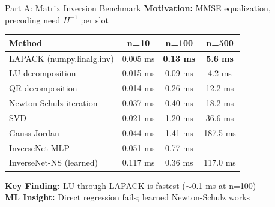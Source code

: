 \documentclass[aspectratio=169]{beamer}
\begin{document}
\begin{frame}{Part A: Matrix Inversion Benchmark}
\textbf{Motivation:} MMSE equalization, precoding need $H^{-1}$ per slot

\begin{table}
\centering
\small
\begin{tabular}{lccc}
\toprule
\textbf{Method} & \textbf{n=10} & \textbf{n=100} & \textbf{n=500} \\
\midrule
LAPACK (numpy.linalg.inv) & 0.005 ms & \textbf{0.13 ms} & \textbf{5.6 ms} \\
LU decomposition & 0.015 ms & 0.09 ms & 4.2 ms \\
QR decomposition & 0.014 ms & 0.26 ms & 12.2 ms \\
Newton-Schulz iteration & 0.037 ms & 0.40 ms & 18.2 ms \\
SVD & 0.021 ms & 1.20 ms & 36.6 ms \\
Gauss-Jordan & 0.044 ms & 1.41 ms & 187.5 ms \\
InverseNet-MLP & 0.051 ms & 0.77 ms & --- \\
InverseNet-NS (learned) & 0.117 ms & 0.36 ms & 117.0 ms \\
\bottomrule
\end{tabular}
\end{table}

\textbf{Key Finding:} LU through LAPACK is fastest ($\sim$0.1 ms at n=100)\\
\textbf{ML Insight:} Direct regression fails; learned Newton-Schulz works
\end{frame}
\end{document}
